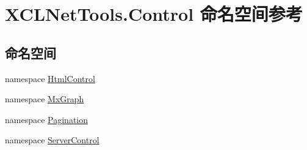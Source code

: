 \hypertarget{namespace_x_c_l_net_tools_1_1_control}{}\section{X\+C\+L\+Net\+Tools.\+Control 命名空间参考}
\label{namespace_x_c_l_net_tools_1_1_control}
\subsection*{命名空间}
\begin{DoxyCompactItemize}
\item 
namespace \hyperlink{namespace_x_c_l_net_tools_1_1_control_1_1_html_control}{Html\+Control}
\item 
namespace \hyperlink{namespace_x_c_l_net_tools_1_1_control_1_1_mx_graph}{Mx\+Graph}
\item 
namespace \hyperlink{namespace_x_c_l_net_tools_1_1_control_1_1_pagination}{Pagination}
\item 
namespace \hyperlink{namespace_x_c_l_net_tools_1_1_control_1_1_server_control}{Server\+Control}
\end{DoxyCompactItemize}
